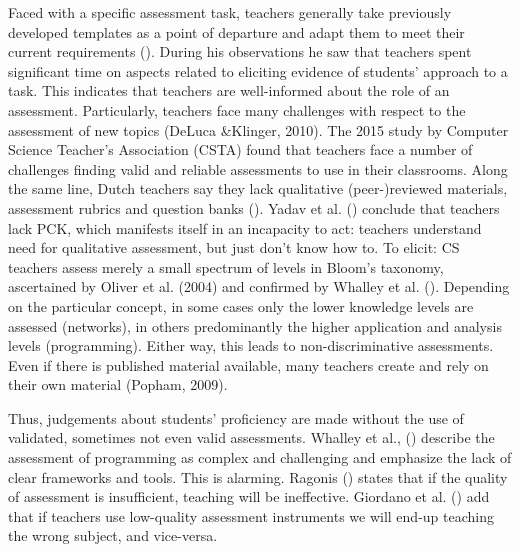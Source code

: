 
Faced with a specific assessment task, teachers generally take previously developed templates as a point of departure and adapt them to meet their current requirements (\cite{hermansen2014reworking}). During his observations he saw that teachers spent significant time on aspects related to eliciting evidence of students' approach to a task. This indicates that teachers are well-informed about the role of an assessment.
Particularly, teachers face many challenges with respect to the assessment of new topics (DeLuca \&Klinger, 2010). The 2015 study by Computer Science Teacher's Association (CSTA) found that teachers face a number of challenges finding valid and reliable assessments to use in their classrooms. Along the same line, Dutch teachers say they lack qualitative (peer-)reviewed materials, assessment rubrics and question banks (\cite{tolboom2014informatica}). Yadav et al. (\cite{Yadav2015}) conclude that teachers lack PCK, which manifests itself in an incapacity to act: teachers understand need for qualitative assessment, but just don't know how to. To elicit: CS teachers assess merely a small spectrum of levels in Bloom's taxonomy, ascertained by Oliver et al. (2004) and confirmed by Whalley et al. (\cite{Whalley2006}). Depending on the particular concept, in some cases only the lower knowledge levels are assessed (networks), in others predominantly the higher application and analysis levels (programming). Either way, this leads to non-discriminative assessments. Even if there is published material available, many teachers create and rely on their own material (Popham, 2009).

Thus, judgements about students' proficiency are made without the use of validated, sometimes not even valid assessments. Whalley et al., (\cite{Whalley2006}) describe the assessment of programming as complex and challenging and emphasize the lack of clear frameworks and tools. This is alarming. Ragonis (\cite{ragonis2012type}) states that if the quality of assessment is insufficient, teaching will be ineffective.  Giordano et al. (\cite{Giordano2015}) add that if teachers use low-quality assessment instruments we will end-up teaching the wrong subject, and vice-versa.





